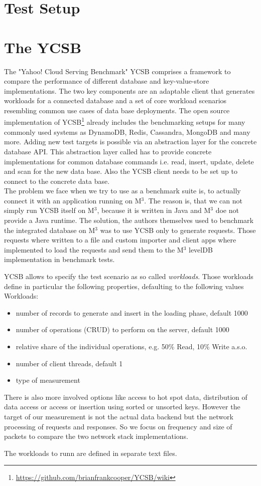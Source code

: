 \section{Test Setup}
\section{The YCSB}

The "Yahoo! Cloud Serving Benchmark" YCSB \cite{YSBC} comprises a framework to compare the performance of different database and key-value-store implementations. The two key components are an adaptable client that generates workloads for a connected database and a set of core workload scenarios resembling common use cases of data base deployments. The open source implementation of YCSB\footnote{\url{https://github.com/brianfrankcooper/YCSB/wiki}} already includes the benchmarking setups for many commonly used systems as DynamoDB, Redis, Cassandra, MongoDB and many more. Adding new test targets is possible via an abstraction layer for the concrete database API. This abstraction layer called  has to provide concrete implementations for common database commands i.e. read, insert, update, delete and scan for the new data base. Also the YCSB client needs to be set up to connect to the concrete data base. \\

The problem we face when we try to use as a benchmark suite is, to actually connect it with an application running on M$^3$. The reason is, that we can not simply run YCSB itself on M$^3$, because it is written in Java and M$^3$ doe not provide a Java runtime. 
The solution, the authors themselves used to benchmark the integrated database on M$^3$ was to use YCSB only to generate requests. Those requests where written to a file and custom importer and client apps where implemented to load the requests and send them to the M$^3$ levelDB implementation in benchmark tests. 

YCSB allows to specify the test scenario as so called \emph{workloads}. Those workloads define in particular the following properties, defaulting to the following values 
Workloads:
\begin{itemize}
    \item number of records to generate and insert in the loading phase, default 1000
    \item number of operations (CRUD) to perform on the server, default 1000
    \item relative share of the individual operations, e.g. 50\% Read, 10\% Write a.s.o.
    \item number of client threads, default 1
    \item type of measurement 
\end{itemize}

There is also more involved options like access to hot spot data, distribution of data access or access or insertion using sorted or unsorted keys. However the target of our measurement is not the actual data backend but the network processing of requests and responses. So we focus on frequency and size of packets to compare the two network stack implementations.

The workloads to runn are defined in separate text files. 
